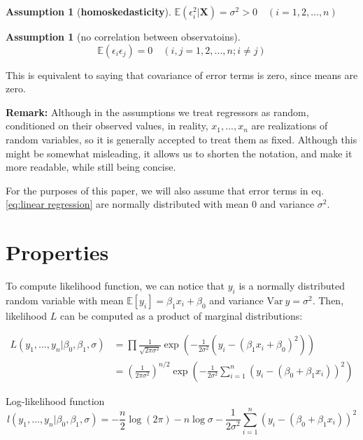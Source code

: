 \documentclass[12pt,a4paper,oneside]{book} %
\newtheorem{assumption}[theorem]{Assumption}
\newcommand{\E}{\mathbb{E}}
\newcommand{\Var}{\mathrm{Var}}
\begin{document}
\begin{assumption}[\textbf{homoskedasticity}]
	$\E(\epsilon_i^2| \mathbf{X}) = \sigma^2 > 0 \quad (i=1,2,...,n)$
\end{assumption}

\begin{assumption}[no correlation between observatoins]
	\[\E (\epsilon_i \epsilon_j) = 0 \quad (i,j = 1, 2, ..., n; i \neq j) \]
\end{assumption}

This is equivalent to saying that covariance of error terms is zero, since means are zero.

\textbf{Remark:} Although in the assumptions we treat regressors as random, conditioned on their observed values, in reality, $x_1, ..., x_n$ are realizations of random variables, so it is generally accepted to treat them as fixed. Although this might be somewhat misleading, it allows us to shorten the notation, and make it more readable, while still being concise.

For the purposes of this paper, we will also assume that error terms in eq. \ref{eq:linear regression}  are normally distributed with mean 0 and variance $\sigma^2$.

\section{Properties}

To compute likelihood function, we can notice that $y_i$ is a normally distributed random variable with mean $\E [y_i] = \beta_1 x_i + \beta_0$ and variance $\Var \ y = \sigma^2$. Then, likelihood $L$ can be computed as a product of marginal distributions:

\begin{align}
	L(y_1, \ldots, y_n | \beta_0, \beta_1, \sigma) &= \prod \frac{1}{\sqrt{2 \pi \sigma^2}} \exp (-\frac{1}{2\sigma^2}(y_i-(\beta_1 x_i + \beta_0)^2))\\
	&= \left( \frac{1}{2\pi\sigma^2} \right)^{n/2} \exp\left( -\frac{1}{2\sigma^2} \sum_{i=1}^{n} (y_i - (\beta_0 + \beta_1 x_i))^2 \right)
\end{align}


Log-likelihood function
\begin{equation} \label{eq:loglikelihood}
	l(y_1, \ldots, y_n | \beta_0, \beta_1, \sigma) = -\frac{n}{2} \log (2 \pi) - n \log \sigma - \frac{1}{2\sigma^2} \sum_{i=1}^{n} (y_i - (\beta_0 + \beta_1 x_i))^2
\end{equation}
\end{document}
